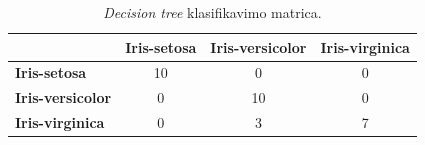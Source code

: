 \begin{table}[H]
    \centering
    \caption{\textit{Decision tree} klasifikavimo matrica.}
    \begin{tabular}{|l|c|c|c|}
        \hline
        & \textbf{Iris-setosa} & \textbf{Iris-versicolor} & \textbf{Iris-virginica} \\
        \hline
        \textbf{Iris-setosa} & 10 & 0 & 0 \\ \hline
        \textbf{Iris-versicolor} & 0 & 10 & 0 \\ \hline
        \textbf{Iris-virginica} & 0 & 3 & 7 \\ \hline
    \end{tabular}
    \label{tab:decision_tree_klasifikavimo_matrica}
\end{table}
